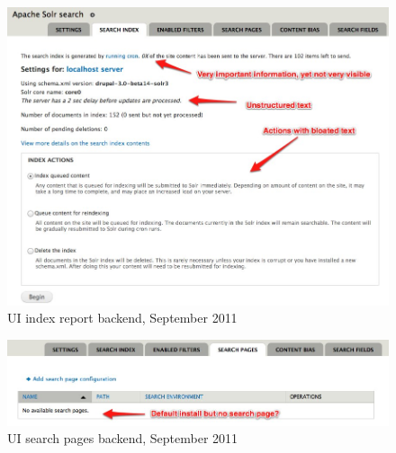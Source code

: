 \begin{figure}[H]
     \includegraphics[width=\textwidth]{images/apachesolr_ui_backend_september_2011_2.jpg}
     \caption{UI index report backend, September 2011}
\end{figure}

\begin{figure}[H]
     \includegraphics[width=\textwidth]{images/apachesolr_ui_backend_september_2011_3.jpg}
     \caption{UI search pages backend, September 2011}
\end{figure}

